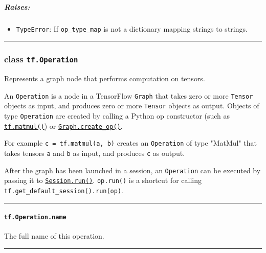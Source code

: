 \subparagraph{Raises: }\label{raises-5}

\begin{itemize}
\tightlist
\item
  \lstinline{TypeError}: If \lstinline{op_type_map} is not a dictionary
  mapping strings to strings.
\end{itemize}


\begin{center}\rule{0.5\linewidth}{\linethickness}\end{center}


\subsubsection{class \lstinline{tf.Operation}} \label{class-tf.operation}

Represents a graph node that performs computation on tensors.

An \lstinline{Operation} is a node in a TensorFlow \lstinline{Graph} that
takes zero or more \lstinline{Tensor} objects as input, and produces zero
or more \lstinline{Tensor} objects as output. Objects of type
\lstinline{Operation} are created by calling a Python op constructor (such
as
\href{../../api_docs/python/math_ops.md\#matmul}{\lstinline{tf.matmul()}})
or
\href{../../api_docs/python/framework.md\#Graph.create_op}{\lstinline{Graph.create_op()}}.

For example \lstinline{c = tf.matmul(a, b)} creates an
\lstinline{Operation} of type "MatMul" that takes tensors \lstinline{a} and
\lstinline{b} as input, and produces \lstinline{c} as output.

After the graph has been launched in a session, an \lstinline{Operation}
can be executed by passing it to
\href{../../api_docs/python/client.md\#Session.run}{\lstinline{Session.run()}}.
\lstinline{op.run()} is a shortcut for calling
\lstinline{tf.get_default_session().run(op)}.

\begin{center}\rule{0.5\linewidth}{\linethickness}\end{center}

\paragraph{\texorpdfstring{\lstinline{tf.Operation.name}
}{tf.Operation.name }}\label{tf.operation.name}

The full name of this operation.

\begin{center}\rule{0.5\linewidth}{\linethickness}\end{center}

